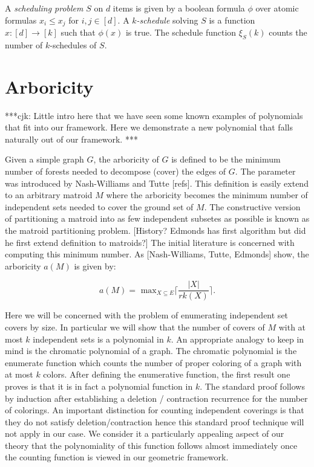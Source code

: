 \documentclass[12pt]{amsart}
\newcommand{\defn}[1]{\emph{#1}}
\begin{document}
A \defn{scheduling problem} $S$ on $d$ items is given by a boolean
formula $\phi$ over atomic formulas $x_i\leq x_j$ for $i,j\in[d]$. A
\defn{$k$-schedule} solving $S$ is a function $x:[d]\rightarrow[k]$
such that $\phi(x)$ is true. The schedule function $\xi_S(k)$ counts
the number of $k$-schedules of $S$.





\section{Arboricity}

***cjk: Little intro here that we have seen some known examples of
polynomials that fit into our framework.  Here we demonstrate a new polynomial 
that falls naturally out of our framework. ***


Given a simple graph $G$, the arboricity of $G$ is defined to be the
minimum number of forests needed to decompose (cover) the edges of
$G$.  The parameter was introduced by Nash-Williams and Tutte [refs].
This definition is easily extend to an arbitrary matroid $M$ where the
arboricity becomes the minimum number of independent sets needed to
cover the ground set of $M$.  The constructive version of partitioning
a matroid into as few independent subsetes as possible is known as the
matroid partitioning problem. [History?  Edmonds has first algorithm
  but did he first extend definition to matroids?]  The initial
literature is concerned with computing this minimum number.  As
[Nash-Williams, Tutte, Edmonds] show, the arboricity $a(M)$ is given
by:

$$ a(M) = \textrm{ max}_{X\subseteq E} \lceil { \frac{|X|}{rk(X)}} \rceil . $$

Here we will be concerned with the problem of enumerating independent
set covers by size.  In particular we will show that the number of
covers of $M$ with at most $k$ independent sets is a polynomial in
$k$.  An appropriate analogy to keep in mind is the chromatic
polynomial of a graph.  The chromatic polynomial is the enumerate
function which counts the number of proper coloring of a graph with at
most $k$ colors.  After defining the enumerative function, the first
result one proves is that it is in fact a polynomial function in $k$.
The standard proof follows by induction after establishing a deletion
/ contraction recurrence for the number of colorings.  An important
distinction for counting independent coverings is that they do not
satisfy deletion/contraction hence this standard proof technique will
not apply in our case.  We consider it a particularly appealing aspect
of our theory that the polynomiality of this function follows almost
immediately once the counting function is viewed in our geometric
framework.
\end{document}
